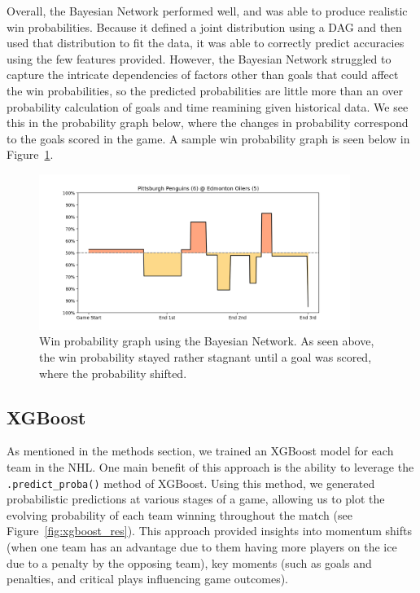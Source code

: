 \documentclass[11pt]{article}
\begin{document}
Overall, the Bayesian Network performed well, and was able to produce realistic win probabilities. Because it defined a joint distribution using a DAG and
then used that distribution to fit the data, it was able to correctly predict accuracies using the few features provided. However, the Bayesian Network struggled to capture the intricate dependencies
of factors other than goals that could affect the win probabilities, so the predicted probabilities are little more than an over probability calculation of goals and time reamining given historical data.
We see this in the probability graph below, where the changes in probability correspond to the goals scored in the game. A sample win probability graph is seen below in Figure~\ref{fig:bayesian_graph}.

\begin{figure}
    \centering
    \includegraphics[width=0.9\textwidth]{images/good_bayesian_example.png}
    \caption{Win probability graph using the Bayesian Network. As seen above, the win probability stayed rather stagnant until a goal was scored, where the probability shifted.}
    \label{fig:bayesian_graph}
\end{figure}

\subsection{XGBoost}

As mentioned in the methods section, we trained an XGBoost model for each team in the NHL. One main benefit of this
approach is the ability to leverage the {\tt .predict\_proba()} method of XGBoost.
Using this method, we generated 
probabilistic predictions at various stages of a game, allowing us to 
plot the evolving probability of each team winning throughout the match
(see Figure~\ref{fig:xgboost_res}). 
This approach provided insights into momentum shifts (when one team 
has an advantage due to them having more players on the ice due to 
a penalty by the opposing team), key moments (such as goals and 
penalties, and critical plays influencing game outcomes).
\end{document}
